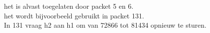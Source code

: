 het is alvast toegelaten door packet 5 en 6.\\
het wordt bijvoorbeeld gebruikt in packet 131.\\
In 131 vraag h2 aan h1 om van 72866 tot 81434 opnieuw te sturen.